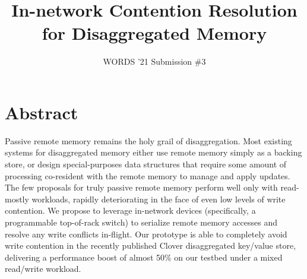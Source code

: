 \documentclass[10pt,twocolumn]{article}
\begin{document}
\title{In-network Contention Resolution for Disaggregated Memory}
\author{WORDS '21 Submission \#3}
\date{}

\maketitle

\section*{Abstract}

Passive remote memory remains the holy grail of disaggregation.  Most
existing systems for disaggregated memory either use remote memory
simply as a backing store, or design special-purposes data structures
that require some amount of processing co-resident with the remote
memory to manage and apply updates.  The few proposals for truly
passive remote memory perform well only with read-mostly workloads,
rapidly deteriorating in the face of even low levels of write
contention.  We propose to leverage in-network devices (specifically,
a programmable top-of-rack switch) to serialize remote memory accesses
and resolve any write conflicts in-flight.  Our prototype is able to
completely avoid write contention in the recently published Clover
disaggregated key/value store, delivering a performance boost of
almost 50\% on our testbed under a mixed read/write workload.









\balance
\vspace{-0.3cm}
{\footnotesize 
}
\vspace{-0.5cm}
\end{document}
